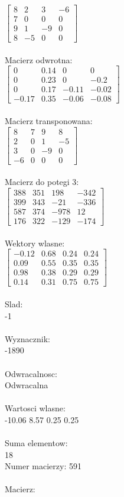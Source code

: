 \documentclass[a4paper,12pt]{article}
\begin{document}
$\begin{bmatrix} 8&2&3&-6\\7&0&0&0\\9&1&-9&0\\8&-5&0&0 \end{bmatrix}$
\\
\\
Macierz odwrotna:\\

$\begin{bmatrix} 0&0.14&0&0\\0&0.23&0&-0.2\\0&0.17&-0.11&-0.02\\-0.17&0.35&-0.06&-0.08 \end{bmatrix}$
\\
\\
Macierz transponowana:\\

$\begin{bmatrix} 8&7&9&8\\2&0&1&-5\\3&0&-9&0\\-6&0&0&0 \end{bmatrix}$
\\
\\
Macierz do potegi 3:\\

$\begin{bmatrix} 388&351&198&-342\\399&343&-21&-336\\587&374&-978&12\\176&322&-129&-174 \end{bmatrix}$
\\
\\
Wektory wlasne:\\

$\begin{bmatrix} -0.12&0.68&0.24&0.24\\0.09&0.55&0.35&0.35\\0.98&0.38&0.29&0.29\\0.14&0.31&0.75&0.75 \end{bmatrix}$
\\
\\
Slad:\\
-1
\\
\\
Wyznacznik:\\
-1890
\\
\\
Odwracalnosc:\\
Odwracalna
\\
\\
Wartosci wlasne:\\
-10.06 8.57 0.25 0.25
\\
\\
Suma elementow:\\
18
\\
\newpage
Numer macierzy:
591
\\
\\
Macierz:\\
\end{document}
